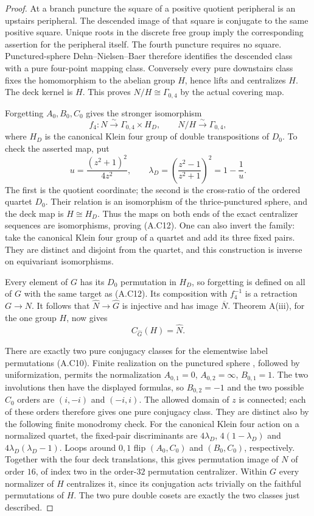 \begin{proof}
At a branch puncture the square of a positive quotient
peripheral is an upstairs peripheral.  The descended image of
that square is conjugate to the same positive square.  Unique
roots in the discrete free group imply the corresponding
assertion for the peripheral itself.  The fourth puncture
requires no square.  Punctured-sphere Dehn--Nielsen--Baer
therefore identifies the descended class with a pure
four-point mapping class.  Conversely every pure downstairs
class fixes the homomorphism to the abelian group $H$, hence
lifts and centralizes $H$.  The deck kernel is $H$.  This proves
$N/H\cong\Gamma_{0,4}$ by the actual covering map.

Forgetting $A_0,B_0,C_0$ gives the stronger isomorphism
\[
 f_4:N\xrightarrow{\sim}\Gamma_{0,4}\times H_D,
 \qquad N/H\xrightarrow{\sim}\Gamma_{0,4},                 \tag{A.C12}
\]
where $H_D$ is the canonical Klein four group of double
transpositions of $D_0$.  To check the asserted map, put
\[
 u=\frac{(z^2+1)^2}{4z^2},\qquad
 \lambda_D=\left(\frac{z^2-1}{z^2+1}\right)^2=1-\frac1u.
                                                               \tag{A.C13}
\]
The first is the quotient coordinate; the second is the
cross-ratio of the ordered quartet $D_0$.  Their relation is
an isomorphism of the thrice-punctured sphere, and the deck
map is $H\cong H_D$.  Thus the maps on both ends of the exact
centralizer sequences are isomorphisms, proving (A.C12).
One can also invert the family: take the canonical Klein four
group of a quartet and add its three fixed pairs.  They are
distinct and disjoint from the quartet, and this construction
is inverse on equivariant isomorphisms.

Every element of $G$ has its $D_0$ permutation in $H_D$, so
forgetting is defined on all of $G$ with the same target as
(A.C12).  Its composition with $f_4^{-1}$ is a retraction
$G\to N$.  It follows that $\widehat N\to\widehat G$ is
injective and has image $\overline N$.  Theorem A(iii), for
the one group $H$, now gives
\[
                  C_{\widehat G}(H)=\widehat N.             \tag{A.C14}
\]

There are exactly two pure conjugacy classes for the
elementwise label permutations (A.C10).  Finite realization on
the punctured sphere \cite[Theorem 5 and \S IV, pp.~255--256]{CA_Kerckhoff1983},
followed by uniformization, permits the
normalization $A_{0,1}=0$, $A_{0,2}=\infty$, $B_{0,1}=1$.
The two involutions then have the displayed formulas, so
$B_{0,2}=-1$ and the two possible $C_0$ orders are
$(i,-i)$ and $(-i,i)$.  The allowed domain of $z$ is connected;
each of these orders therefore gives one pure conjugacy class.
They are distinct also by the following finite monodromy check.
For the canonical Klein four action on a normalized quartet,
the fixed-pair discriminants are
$4\lambda_D$, $4(1-\lambda_D)$ and
$4\lambda_D(\lambda_D-1)$.  Loops around $0,1$ flip
$(A_0,C_0)$ and $(B_0,C_0)$, respectively.  Together with
the four deck translations, this gives permutation image of
$N$ of order $16$, of index two in the order-$32$ permutation
centralizer.  Within $G$ every normalizer of $H$ centralizes
it, since its conjugation acts trivially on the faithful
permutations of $H$.  The two pure double cosets are exactly
the two classes just described.


\end{proof}
